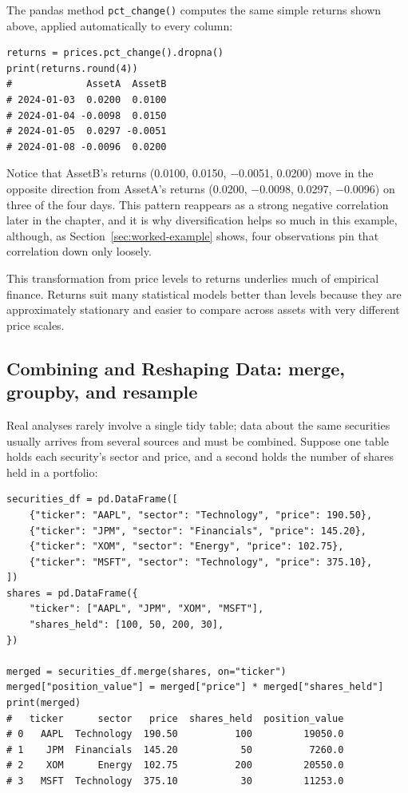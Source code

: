 \documentclass[../ai_in_finance]{subfiles}
\begin{document}
The pandas method \texttt{pct\_change()} computes the same simple returns shown above, applied automatically to every column:

\begin{verbatim}
returns = prices.pct_change().dropna()
print(returns.round(4))
#             AssetA  AssetB
# 2024-01-03  0.0200  0.0100
# 2024-01-04 -0.0098  0.0150
# 2024-01-05  0.0297 -0.0051
# 2024-01-08 -0.0096  0.0200
\end{verbatim}

Notice that AssetB's returns (0.0100, 0.0150, $-$0.0051, 0.0200) move in the opposite direction from AssetA's returns (0.0200, $-$0.0098, 0.0297, $-$0.0096) on three of the four days. This pattern reappears as a strong negative correlation later in the chapter, and it is why diversification helps so much in this example, although, as Section~\ref{sec:worked-example} shows, four observations pin that correlation down only loosely.

This transformation from price levels to returns underlies much of empirical finance. Returns suit many statistical models better than levels because they are approximately stationary and easier to compare across assets with very different price scales.

\subsection{Combining and Reshaping Data: merge, groupby, and resample}
\label{sec:python-merge-groupby}

Real analyses rarely involve a single tidy table; data about the same securities usually arrives from several sources and must be combined. Suppose one table holds each security's sector and price, and a second holds the number of shares held in a portfolio:

\begin{verbatim}
securities_df = pd.DataFrame([
    {"ticker": "AAPL", "sector": "Technology", "price": 190.50},
    {"ticker": "JPM", "sector": "Financials", "price": 145.20},
    {"ticker": "XOM", "sector": "Energy", "price": 102.75},
    {"ticker": "MSFT", "sector": "Technology", "price": 375.10},
])
shares = pd.DataFrame({
    "ticker": ["AAPL", "JPM", "XOM", "MSFT"],
    "shares_held": [100, 50, 200, 30],
})

merged = securities_df.merge(shares, on="ticker")
merged["position_value"] = merged["price"] * merged["shares_held"]
print(merged)
#   ticker      sector   price  shares_held  position_value
# 0   AAPL  Technology  190.50          100         19050.0
# 1    JPM  Financials  145.20           50          7260.0
# 2    XOM      Energy  102.75          200         20550.0
# 3   MSFT  Technology  375.10           30         11253.0
\end{verbatim}
\end{document}
